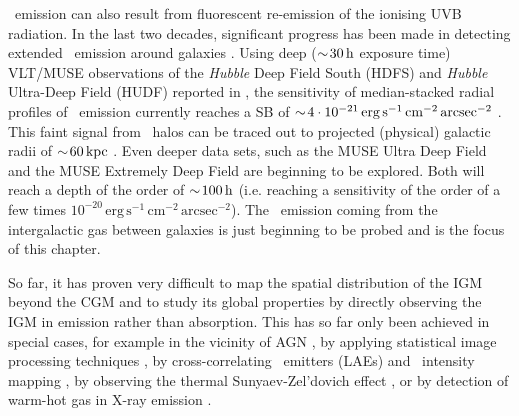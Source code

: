 \lya\ emission can also result from fluorescent re-emission of the ionising UVB radiation. In the last two decades, significant progress has been made in detecting extended \lya\ emission around galaxies \citep{1996ApJ...457..490F, 1999MNRAS.305..849F, 1999AJ....118.2547K, 2000ApJ...532..170S, 2004AJ....128.2073H, 2008ApJ...681..856R, 2011ApJ...736..160S, 2012MNRAS.425..878M, 2013ApJ...762...38P, 2014MNRAS.442..110M, 2016ApJ...832...37G, 2016A&A...587A..98W, 2017ApJ...837...71C, 2017A&A...608A...8L, 2017MNRAS.465.3803V, 2018ApJ...856...72O, 2018Natur.562..229W, 2019MNRAS.482.3162A}. Using deep ($\sim \! 30 \, \mathrm{h}$ exposure time) VLT/MUSE observations of the \textit{Hubble} Deep Field South (HDFS) and \textit{Hubble} Ultra-Deep Field (HUDF) reported in \citet{2015A&A...575A..75B, 2017A&A...608A...1B}, the sensitivity of median-stacked radial profiles of \lya\ emission currently reaches a SB of $\sim \! 4 \cdot 10^{-21} \, \mathrm{erg \, s^{-1} \, cm^{-2} \, arcsec^{-2}}$ \citep{2018Natur.562..229W}. This faint signal from \lya\ halos can be traced out to projected (physical) galactic radii of $\sim \! 60 \, \mathrm{kpc}$ \citep{2018Natur.562..229W}. Even deeper data sets, such as the MUSE Ultra Deep Field \citep[MUDF, described in][]{2019MNRAS.485L..62L} and the MUSE Extremely Deep Field \citep[MXDF, see][]{2021A&A...647A.107B} are beginning to be explored. Both will reach a depth of the order of $\sim \! 100 \, \mathrm{h}$ (i.e. reaching a sensitivity of the order of a few times $10^{-20} \, \mathrm{erg \, s^{-1} \, cm^{-2} \, arcsec^{-2}}$). The \lya\ emission coming from the intergalactic gas between galaxies is just beginning to be probed and is the focus of this chapter.

So far, it has proven very difficult to map the spatial distribution of the IGM beyond the CGM and to study its global properties by directly observing the IGM in emission rather than absorption. This has so far only been achieved in special cases, for example in the vicinity of AGN \citep[e.g.][]{2014Natur.506...63C, 2014ApJ...786..106M, 2015Sci...348..779H, 2016ApJ...831...39B, 2019Sci...366...97U}, by applying statistical image processing techniques \citep[][; in this case, the CGM only showed a preferential direction of extension towards neighbouring galaxies, no significant signal of filamentary structure in the IGM was found]{2018MNRAS.475.3854G}, by cross-correlating \lya\ emitters (LAEs) and \lya\ intensity mapping \citep{2021ApJ...916...22K}, by observing the thermal Sunyaev-Zel’dovich effect \citep[e.g.][]{2019A&A...624A..48D, 2019MNRAS.483..223T}, or by detection of warm-hot gas in X-ray emission \citep[e.g.][]{1999A&A...341...23K, 2015Natur.528..105E}.

